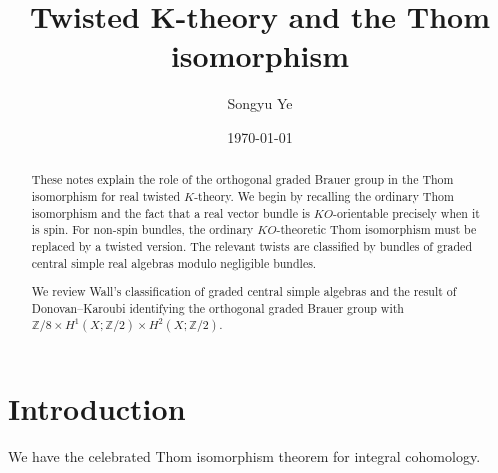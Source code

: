\documentclass{amsart}
\numberwithin{equation}{section}
\theoremstyle{plain} %
\theoremstyle{definition}
\theoremstyle{remark}
\begin{document}
\title{Twisted K-theory and the Thom isomorphism}


\author{Songyu Ye} 

\address{}






\date{\today}

\begin{abstract}
These notes explain the role of the orthogonal graded Brauer group in the
Thom isomorphism for real twisted $K$-theory. We begin by recalling the
ordinary Thom isomorphism and the fact that a real vector bundle is
$KO$-orientable precisely when it is spin. For non-spin bundles, the ordinary
$KO$-theoretic Thom isomorphism must be replaced by a twisted version. The
relevant twists are classified by bundles of graded central simple real
algebras modulo negligible bundles.

We review Wall's classification of graded central simple algebras and the
result of Donovan--Karoubi identifying the orthogonal graded Brauer group with $\mathbb Z/8 \times H^1(X;\mathbb Z/2)\times H^2(X;\mathbb Z/2)$.
\end{abstract}


\maketitle

\section{Introduction}
We have the celebrated Thom isomorphism theorem for integral cohomology.
\end{document}
